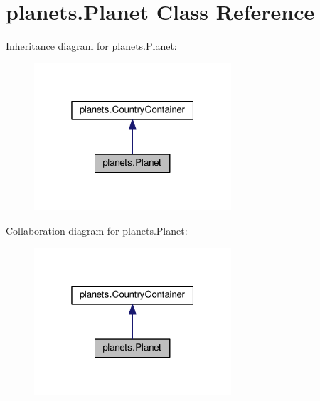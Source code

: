 \hypertarget{classplanets_1_1_planet}{}\section{planets.\+Planet Class Reference}
\label{classplanets_1_1_planet}


Inheritance diagram for planets.\+Planet\+:\nopagebreak
\begin{figure}[H]
\begin{center}
\leavevmode
\includegraphics[width=208pt]{classplanets_1_1_planet__inherit__graph}
\end{center}
\end{figure}


Collaboration diagram for planets.\+Planet\+:\nopagebreak
\begin{figure}[H]
\begin{center}
\leavevmode
\includegraphics[width=208pt]{classplanets_1_1_planet__coll__graph}
\end{center}
\end{figure}
